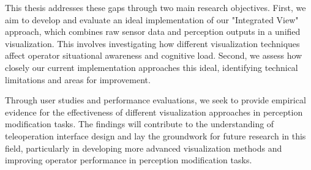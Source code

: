 This thesis addresses these gaps through two main research objectives. First, we aim to develop and evaluate an ideal implementation of our "Integrated View" approach, which combines raw sensor data and perception outputs in a unified visualization. This involves investigating how different visualization techniques affect operator situational awareness and cognitive load. Second, we assess how closely our current implementation approaches this ideal, identifying technical limitations and areas for improvement.

Through user studies and performance evaluations, we seek to provide empirical evidence for the effectiveness of different visualization approaches in perception modification tasks. The findings will contribute to the understanding of teleoperation interface design and lay the groundwork for future research in this field, particularly in developing more advanced visualization methods and improving operator performance in perception modification tasks.


